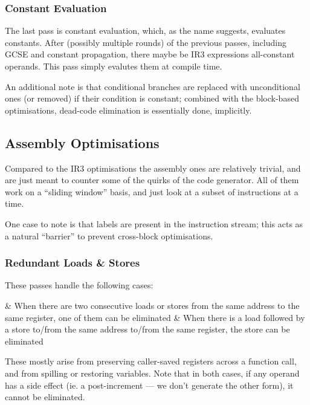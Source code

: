 \documentclass[12pt]{article}
\begin{document}


\subsubsection{Constant Evaluation}

The last pass is constant evaluation, which, as the name suggests, evaluates constants. After (possibly multiple rounds) of
the previous passes, including GCSE and constant propagation, there maybe be IR3 expressions all-constant operands. This
pass simply evalutes them at compile time.

An additional note is that conditional branches are replaced with unconditional ones (or removed) if their condition is constant;
combined with the block-based optimisations, dead-code elimination is essentially done, implicitly.



\subsection{Assembly Optimisations}

Compared to the IR3 optimisations the assembly ones are relatively trivial, and are just meant to counter some of the quirks
of the code generator. All of them work on a \enquote{sliding window} basis, and just look at a subset of instructions at a time.

One case to note is that labels are present in the instruction stream; this acts as a natural \enquote{barrier} to prevent
cross-block optimisations.


\subsubsection{Redundant Loads \& Stores}

These passes handle the following cases:

\begin{romanlist2}
&   When there are two consecutive loads or stores from the same address to the same register, one of them can be eliminated
&   When there is a load followed by a store to/from the same address to/from the same register, the store can be eliminated
\end{romanlist2}

These mostly arise from preserving caller-saved registers across a function call, and from spilling or restoring variables.
Note that in both cases, if any operand has a side effect (ie. a post-increment \eqtt{!} --- we don't generate the other form),
it cannot be eliminated.
\end{document}
